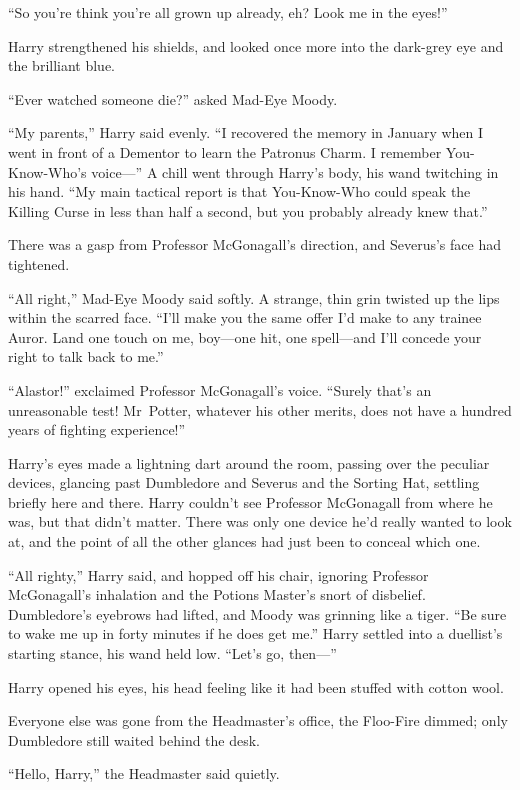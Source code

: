 “So you’re think you’re all grown up already, eh? Look me in the eyes!”

Harry strengthened his shields, and looked once more into the dark-grey eye and the brilliant blue.

“Ever watched someone die?” asked Mad-Eye Moody.

“My parents,” Harry said evenly. “I recovered the memory in January when I went in front of a Dementor to learn the Patronus Charm. I remember You-Know-Who’s voice—” A chill went through Harry’s body, his wand twitching in his hand. “My main tactical report is that You-Know-Who could speak the Killing Curse in less than half a second, but you probably already knew that.”

There was a gasp from Professor McGonagall’s direction, and Severus’s face had tightened.

“All right,” Mad-Eye Moody said softly. A strange, thin grin twisted up the lips within the scarred face. “I’ll make you the same offer I’d make to any trainee Auror. Land one touch on me, boy—one hit, one spell—and I’ll concede your right to talk back to me.”

“Alastor!” exclaimed Professor McGonagall’s voice. “Surely that’s an unreasonable test! Mr~Potter, whatever his other merits, does not have a hundred years of fighting experience!”

Harry’s eyes made a lightning dart around the room, passing over the peculiar devices, glancing past Dumbledore and Severus and the Sorting Hat, settling briefly here and there. Harry couldn’t see Professor McGonagall from where he was, but that didn’t matter. There was only one device he’d really wanted to look at, and the point of all the other glances had just been to conceal which one.

“All righty,” Harry said, and hopped off his chair, ignoring Professor McGonagall’s inhalation and the Potions Master’s snort of disbelief. Dumbledore’s eyebrows had lifted, and Moody was grinning like a tiger. “Be sure to wake me up in forty minutes if he does get me.” Harry settled into a duellist’s starting stance, his wand held low. “Let’s go, then—”

\later

Harry opened his eyes, his head feeling like it had been stuffed with cotton wool.

Everyone else was gone from the Headmaster’s office, the Floo-Fire dimmed; only Dumbledore still waited behind the desk.

“Hello, Harry,” the Headmaster said quietly.

